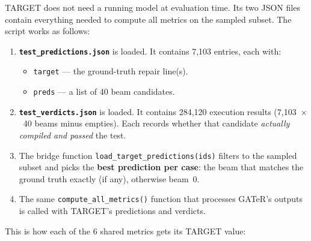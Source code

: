 \documentclass[11pt,a4paper]{article}
\begin{document}
TARGET does not need a running model at evaluation time.
Its two JSON files contain everything needed to compute all metrics
on the sampled subset. The script works as follows:

\begin{enumerate}
    \item \textbf{\texttt{test\_predictions.json}} is loaded.
          It contains 7,103 entries, each with:
          \begin{itemize}
              \item \texttt{target} --- the ground-truth repair line(s).
              \item \texttt{preds} --- a list of 40 beam candidates.
          \end{itemize}
    \item \textbf{\texttt{test\_verdicts.json}} is loaded.
          It contains 284,120 execution results (7,103~$\times$~40 beams
          minus empties). Each records whether that candidate
          \emph{actually compiled and passed} the test.
    \item The bridge function \texttt{load\_target\_predictions(ids)}
          filters to the sampled subset and picks the
          \textbf{best prediction per case}: the beam that matches the
          ground truth exactly (if any), otherwise beam~0.
    \item The same \texttt{compute\_all\_metrics()} function that
          processes GATeR's outputs is called with TARGET's
          predictions and verdicts.
\end{enumerate}

This is how each of the 6 shared metrics gets its TARGET value:
\end{document}
